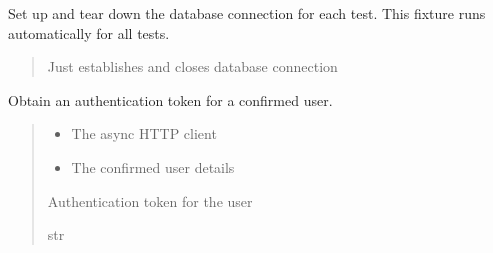\documentclass[letterpaper,10pt,openany,oneside,english]{sphinxmanual}
\begin{document}

\begin{savenotes}\begin{fulllineitems}
\label{\detokenize{modules/tests:storeapi.tests.conftest.db}}
\pysigstartsignatures
{}
\pysigstopsignatures
\sphinxAtStartPar
Set up and tear down the database connection for each test.
This fixture runs automatically for all tests.
\begin{quote}\begin{description}
\sphinxAtStartPar
{} \textendash{} Just establishes and closes database connection

\end{description}\end{quote}

\end{fulllineitems}\end{savenotes}


\begin{savenotes}\begin{fulllineitems}
\label{\detokenize{modules/tests:storeapi.tests.conftest.logged_in_token_fixture}}
\pysigstartsignatures
{}
\pysigstopsignatures
\sphinxAtStartPar
Obtain an authentication token for a confirmed user.
\begin{quote}\begin{description}
\begin{itemize}
\item {} 
\sphinxAtStartPar
{} \textendash{} The async HTTP client

\item {} 
\sphinxAtStartPar
{} \textendash{} The confirmed user details

\end{itemize}

\sphinxAtStartPar
Authentication token for the user

\sphinxAtStartPar
str

\end{description}\end{quote}

\end{fulllineitems}\end{savenotes}
\end{document}
